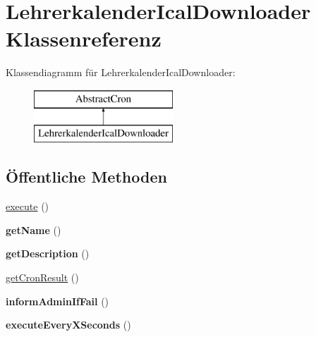 \hypertarget{class_lehrerkalender_ical_downloader}{}\section{Lehrerkalender\+Ical\+Downloader Klassenreferenz}
\label{class_lehrerkalender_ical_downloader}
Klassendiagramm für Lehrerkalender\+Ical\+Downloader\+:\begin{figure}[H]
\begin{center}
\leavevmode
\includegraphics[height=2.000000cm]{class_lehrerkalender_ical_downloader}
\end{center}
\end{figure}
\subsection*{Öffentliche Methoden}
\begin{DoxyCompactItemize}
\item 
\mbox{\hyperlink{class_lehrerkalender_ical_downloader_a07a5b76e1a4b0dcdfe2fc1dbb4b75816}{execute}} ()
\item 
\mbox{\label{class_lehrerkalender_ical_downloader_a7806127492a3589e83270b4c74a2ef71}} 
{\bfseries get\+Name} ()
\item 
\mbox{\label{class_lehrerkalender_ical_downloader_acb39e25f3da30ea5579d40ed1a872aa8}} 
{\bfseries get\+Description} ()
\item 
\mbox{\hyperlink{class_lehrerkalender_ical_downloader_a49cb738163fe83288c1f80cfa80031e6}{get\+Cron\+Result}} ()
\item 
\mbox{\label{class_lehrerkalender_ical_downloader_add94e1b0742afca7e44be9e55047b10a}} 
{\bfseries inform\+Admin\+If\+Fail} ()
\item 
\mbox{\label{class_lehrerkalender_ical_downloader_a07f6f56c161b9347752b60432ba7f5bf}} 
{\bfseries execute\+Every\+X\+Seconds} ()
\end{DoxyCompactItemize}


